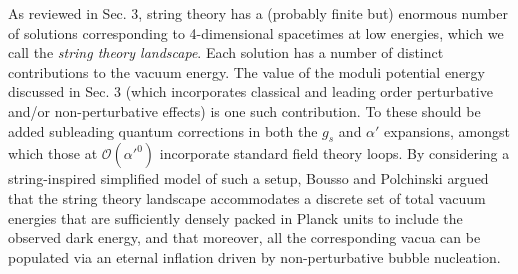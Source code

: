 As reviewed in Sec. 3, string theory has a (probably finite \cite{Douglas:2003um, Ashok:2003gk} but) enormous number of solutions corresponding to 4-dimensional spacetimes at low energies, which we call the \emph{string theory landscape}. Each solution has a number of distinct contributions to the vacuum energy.  The value of the moduli potential energy discussed in Sec. 3 (which incorporates classical and leading order perturbative and/or non-perturbative effects) is one such contribution. To these should be added subleading quantum corrections in both the $g_s$ and $\alpha'$ expansions, amongst which those at $\mathcal{O}(\alpha'^0)$ incorporate standard field theory loops. By considering a string-inspired simplified model of such a setup, Bousso and Polchinski \cite{Bousso:2000xa} argued that the string theory landscape accommodates a discrete set of total vacuum energies that are sufficiently densely packed in Planck units to include the observed dark energy, and that moreover, all the corresponding vacua can be populated via an eternal inflation driven by non-perturbative bubble nucleation.

